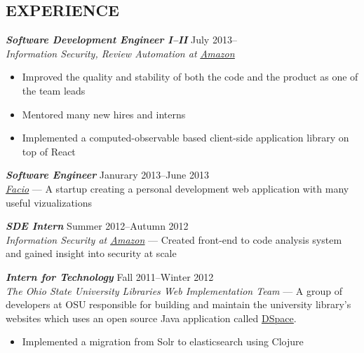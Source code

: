 \documentclass[line,letterpaper]{resume}
\begin{document}
\begin{resume}
    \section{\uppercase{Experience}}

    {\sl\textbf{Software Development Engineer I--II}} \hfill July 2013--\\
    \emph{Information Security, Review Automation at
    \underline{\href{http://www.amazon.com/}{Amazon}}}
    \begin{itemize}
        \item Improved the quality and stability of both the code and the
            product as one of the team leads
        \item Mentored many new hires and interns
        \item Implemented a computed-observable based client-side application
            library on top of React
    \end{itemize}
    \vspace{-6pt}

    {\sl\textbf{Software Engineer}} \hfill Janurary 2013--June 2013\\
    \emph{\underline{\href{http://www.facio.com/}{Facio}}} ---
    A startup creating a personal development web application with many
    useful vizualizations
    \vspace{-6pt}

    {\sl\textbf{SDE Intern}} \hfill Summer 2012--Autumn 2012\\
    \emph{Information Security at
    \underline{\href{http://www.amazon.com/}{Amazon}}} --- Created front-end to
    code analysis system and gained insight into security at scale
    \vspace{-6pt}

    {\sl\textbf{Intern for Technology}} \hfill Fall 2011--Winter 2012\\
    \emph{The Ohio State University Libraries Web Implementation Team} --- A
    group of developers at OSU responsible for building and maintain the
    university library's websites which uses an open source Java application
    called
    \underline{\href{https://github.com/osulibraries/DSpaceOSUKB/wiki}{DSpace}}.
    \begin{itemize}
        \item Implemented a migration from Solr to elasticsearch using Clojure
    \end{itemize}
    \vspace{-6pt}


\end{resume}
\end{document}
